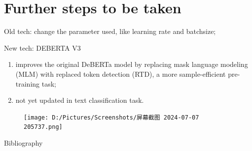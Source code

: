 \documentclass{beamer}
\begin{document}
\section{Further steps to be taken}
\begin{frame}
  Old tech: change the parameter used, like learning rate and batchsize;
  
  New tech: DEBERTA V3\cite{he2023debertav3improvingdebertausing}
  \begin{enumerate}
    \item improves the original DeBERTa model by replacing mask language modeling (MLM) with replaced token detection (RTD), a more sample-efficient pre-training task;
    \item not yet updated in text classification task.
  \end{enumerate}
  \begin{figure}[H]
    \centering
    \texttt{[image: D:/Pictures/Screenshots/屏幕截图 2024-07-07 205737.png]}
  \end{figure}
\end{frame}
\begin{frame}[allowframebreaks]{Bibliography}
  
\end{frame}
\end{document}

